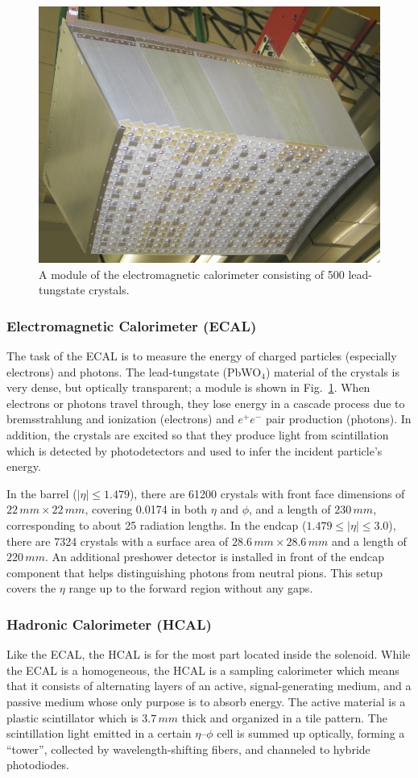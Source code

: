 \begin{figure}
	\includegraphics[width=.7\textwidth]{Detector/ECAL_crystal}
	\centering
	\caption{A module of the electromagnetic calorimeter consisting of 500 lead-tungstate crystals.}
	\label{fig:ECAL}
\end{figure}

\subsubsection*{Electromagnetic Calorimeter (ECAL)}
The task of the ECAL is to measure the energy of charged particles (especially electrons) and photons. The lead-tungstate (PbWO$_4$) material of the crystals is very dense, but optically transparent; a module is shown in Fig.~\ref{fig:ECAL}. When electrons or photons travel through, they lose energy in a cascade process due to bremsstrahlung and ionization (electrons) and $e^+ e^-$ pair production (photons). In addition, the crystals are excited so that they produce light from scintillation which is detected by photodetectors and used to infer the incident particle's energy.

In the barrel ($|\eta| \leq 1.479$), there are 61200 crystals with front face dimensions of $22\,\unit{mm} \times 22\,\unit{mm}$, covering 0.0174 in both $\eta$ and $\phi$, and a length of $230\,\unit{mm}$, corresponding to about 25 radiation lengths. In the endcap ($1.479 \leq |\eta| \leq 3.0$), there are 7324 crystals with a surface area of $28.6\,\unit{mm} \times 28.6\,\unit{mm}$ and a length of $220\,\unit{mm}$. An additional preshower detector is installed in front of the endcap component that helps distinguishing photons from neutral pions. This setup covers the $\eta$ range up to the forward region without any gaps.

\subsubsection*{Hadronic Calorimeter (HCAL)}
Like the ECAL, the HCAL is for the most part located inside the solenoid. While the ECAL is a homogeneous, the HCAL is a sampling calorimeter which means that it consists of alternating layers of an active, signal-generating medium, and a passive medium whose only purpose is to absorb energy. The active material is a plastic scintillator which is $3.7\,\unit{mm}$ thick and organized in a tile pattern. The scintillation light emitted in a certain $\eta$--$\phi$ cell is summed up optically, forming a ``tower'', collected by wavelength-shifting fibers, and channeled to hybride photodiodes.

